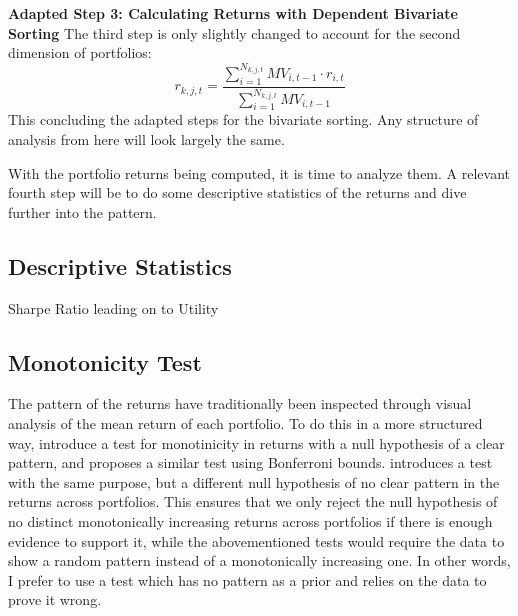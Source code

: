 \textbf{Adapted Step 3: Calculating Returns with Dependent Bivariate Sorting} The third step is only slightly changed to account for the second dimension of portfolios:
\begin{equation}
	r_{k,j,t}=\frac{\sum_{i=1}^{N_{k,j,t}}MV_{i,t-1}\cdot r_{i,t}}{\sum_{i=1}^{N_{k,j,t}}MV_{i,t-1}}
\end{equation}
This concluding the adapted steps for the bivariate sorting. Any structure of analysis from here will look largely the same. 

With the portfolio returns being computed, it is time to analyze them. A relevant fourth step will be to do some descriptive statistics of the returns and dive further into the pattern. 



\subsection{Descriptive Statistics}

Sharpe Ratio leading on to Utility


\subsection{Monotonicity Test}

The pattern of the returns have traditionally been inspected through visual analysis of the mean return of each portfolio. To do this in a more structured way, \cite{wolak1987exact, wolak1989testing} introduce a test for monotinicity in returns with a null hypothesis of a clear pattern, and \cite{fama1984term} proposes a similar test using Bonferroni bounds. \cite{patton2010monotonicity} introduces a test with the same purpose, but a different null hypothesis of no clear pattern in the returns across portfolios. This ensures that we only reject the null hypothesis of no distinct monotonically increasing returns across portfolios if there is enough evidence to support it, while the abovementioned tests would require the data to show a random pattern instead of a monotonically increasing one. In other words, I prefer to use a test which has no pattern as a prior and relies on the data to prove it wrong.

